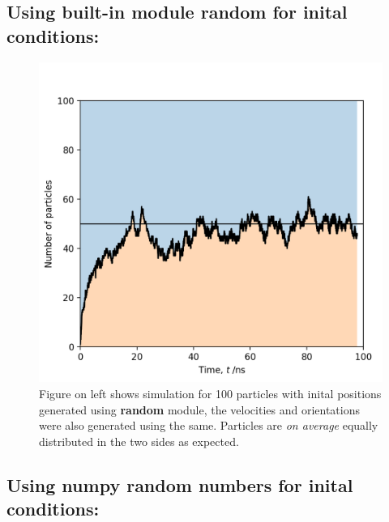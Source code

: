 \documentclass{article}
\begin{document}
\subsection{Using built-in module random for inital conditions:}

\begin{figure}[H]
    \begin{minipage}[c]{0.5\textwidth}
    \includegraphics[width=\textwidth]{Figure_3a.png}
    \end{minipage}\hfill
    \begin{minipage}[c]{0.5\textwidth}
    \caption{
        Figure on left shows simulation for 100 particles with inital positions generated using 
        \textbf{random} module, the velocities and orientations were also generated using the same.
        Particles are \textit{on average} equally distributed in the two sides as expected. 
    } \label{fig:3a}
    \end{minipage}
\end{figure}


\subsection{Using numpy random numbers for inital conditions:}
\end{document}
